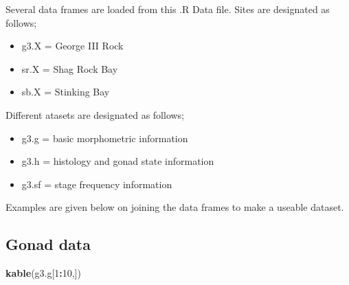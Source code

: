 \documentclass[]{article}
\newenvironment{Shaded}{\begin{snugshade}}{\end{snugshade}}
\newcommand{\DecValTok}[1]{\textcolor[rgb]{0.00,0.00,0.81}{#1}}
\newcommand{\KeywordTok}[1]{\textcolor[rgb]{0.13,0.29,0.53}{\textbf{#1}}}
\newcommand{\NormalTok}[1]{#1}
\newcommand{\OperatorTok}[1]{\textcolor[rgb]{0.81,0.36,0.00}{\textbf{#1}}}
\providecommand{\tightlist}{%
  \setlength{\itemsep}{0pt}\setlength{\parskip}{0pt}}
\begin{document}
Several data frames are loaded from this .R Data file. Sites are
designated as follows;

\begin{itemize}
\tightlist
\item
  g3.X = George III Rock
\item
  sr.X = Shag Rock Bay
\item
  sb.X = Stinking Bay
\end{itemize}

Different atasets are designated as follows;

\begin{itemize}
\tightlist
\item
  g3.g = basic morphometric information
\item
  g3.h = histology and gonad state information
\item
  g3.sf = stage frequency information
\end{itemize}

Examples are given below on joining the data frames to make a useable
dataset.

\hypertarget{gonad-data}{%
\subsection{Gonad data}\label{gonad-data}}

\begin{Shaded}
\begin{Highlighting}[]
\KeywordTok{kable}\NormalTok{(g3.g[}\DecValTok{1}\OperatorTok{:}\DecValTok{10}\NormalTok{,])}
\end{Highlighting}
\end{Shaded}
\end{document}
